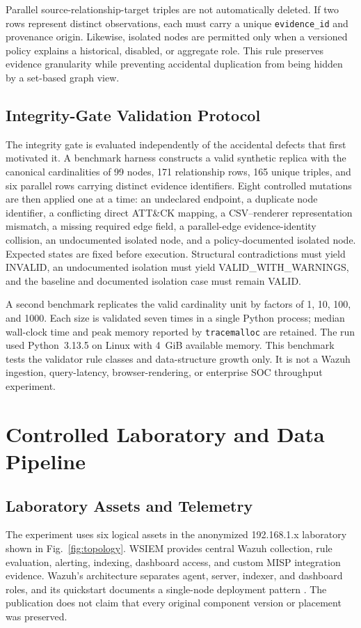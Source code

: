 \documentclass[a4paper,conference]{IEEEtran}
\begin{document}
Parallel source-relationship-target triples are not automatically deleted. If two rows represent distinct observations, each must carry a unique \texttt{evidence\_id} and provenance origin. Likewise, isolated nodes are permitted only when a versioned policy explains a historical, disabled, or aggregate role. This rule preserves evidence granularity while preventing accidental duplication from being hidden by a set-based graph view.

\subsection{Integrity-Gate Validation Protocol}
The integrity gate is evaluated independently of the accidental defects that first motivated it. A benchmark harness constructs a valid synthetic replica with the canonical cardinalities of 99 nodes, 171 relationship rows, 165 unique triples, and six parallel rows carrying distinct evidence identifiers. Eight controlled mutations are then applied one at a time: an undeclared endpoint, a duplicate node identifier, a conflicting direct ATT\&CK mapping, a CSV--renderer representation mismatch, a missing required edge field, a parallel-edge evidence-identity collision, an undocumented isolated node, and a policy-documented isolated node. Expected states are fixed before execution. Structural contradictions must yield INVALID, an undocumented isolation must yield VALID\_WITH\_WARNINGS, and the baseline and documented isolation case must remain VALID.

A second benchmark replicates the valid cardinality unit by factors of 1, 10, 100, and 1000. Each size is validated seven times in a single Python process; median wall-clock time and peak memory reported by \texttt{tracemalloc} are retained. The run used Python~3.13.5 on Linux with 4~GiB available memory. This benchmark tests the validator rule classes and data-structure growth only. It is not a Wazuh ingestion, query-latency, browser-rendering, or enterprise SOC throughput experiment.

\section{Controlled Laboratory and Data Pipeline}
\subsection{Laboratory Assets and Telemetry}
The experiment uses six logical assets in the anonymized 192.168.1.x laboratory shown in Fig.~\ref{fig:topology}. WSIEM provides central Wazuh collection, rule evaluation, alerting, indexing, dashboard access, and custom MISP integration evidence. Wazuh's architecture separates agent, server, indexer, and dashboard roles, and its quickstart documents a single-node deployment pattern \cite{wazuh_arch,wazuh_quickstart}. The publication does not claim that every original component version or placement was preserved.
\end{document}
